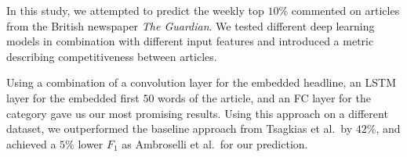 In this study, we attempted to predict the weekly top $10\%$ commented on articles from the British newspaper \textit{The Gu\-ar\-di\-an}. 
We tested different deep learning models in combination with different input features and introduced a metric describing competitiveness between articles.

Using a combination of a convolution layer for the embedded headline, an LSTM layer for the embedded first $50$ words of the article, and an FC layer for the category gave us our most promising results.
Using this approach on a different dataset, we outperformed the baseline approach from Tsagkias et al.\ by $42\%$, and achieved a $5\%$ lower $F_1$ as Ambroselli et al.\ for our prediction.